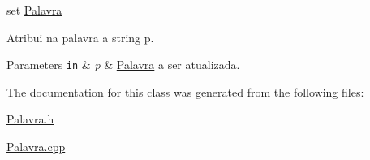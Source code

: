 set \hyperlink{classPalavra}{Palavra} 

Atribui na palavra a string p. 
\begin{DoxyParams}[1]{Parameters}
\mbox{\tt in}  & {\em p} & \hyperlink{classPalavra}{Palavra} a ser atualizada. \\
\hline
\end{DoxyParams}


The documentation for this class was generated from the following files\+:\begin{DoxyCompactItemize}
\item 
\hyperlink{Palavra_8h}{Palavra.\+h}\item 
\hyperlink{Palavra_8cpp}{Palavra.\+cpp}\end{DoxyCompactItemize}
